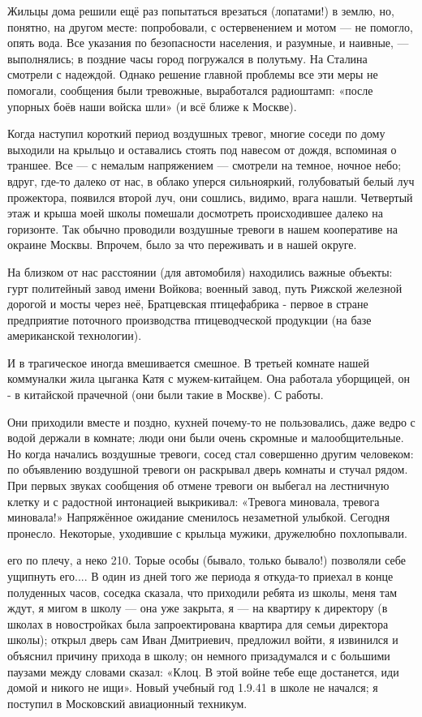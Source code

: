 \label{206-1}
Жильцы дома решили ещё раз попытаться врезаться (лопатами!) в землю, но, понятно, на другом месте: попробовали, с остервенением и мотом — не помогло, опять вода. Все указания по безопасности населения, и разумные, и наивные, — выполнялись; в поздние часы город погружался в полутьму. На Сталина смотрели с надеждой.
Однако решение главной проблемы все эти меры не помогали, сообщения были тревожные, выработался радиоштамп: «после упорных боёв наши войска шли» (и всё ближе к Москве).

\label{207-1}
Когда наступил короткий период воздушных тревог, многие соседи по дому выходили на крыльцо и оставались стоять под навесом от дождя, вспоминая о траншее. Все — с немалым напряжением — смотрели на темное, ночное небо; вдруг, где-то далеко от нас, в облако уперся сильнояркий, голубоватый белый луч прожектора, появился второй луч, они сошлись, видимо, врага нашли. Четвертый этаж и крыша моей школы помешали досмотреть происходившее далеко на горизонте. Так обычно проводили воздушные тревоги в нашем кооперативе на окраине Москвы. Впрочем, было за что переживать и в нашей округе.

\label{208-1}
На близком от нас расстоянии (для автомобиля) находились важные объекты: гурт политейный завод имени Войкова; военный завод, путь Рижской железной дорогой и мосты через неё, Братцевская птицефабрика - первое в стране предприятие поточного производства птицеводческой продукции (на базе американской технологии).

И в трагическое иногда вмешивается смешное. В третьей комнате нашей коммуналки жила цыганка Катя с мужем-китайцем. Она работала уборщицей, он - в китайской прачечной (они были такие в Москве). С работы.

\label{209-1}
Они приходили вместе и поздно, кухней почему-то не пользовались, даже ведро с водой держали в комнате; люди они были очень скромные и малообщительные. Но когда начались воздушные тревоги, сосед стал совершенно другим человеком: по объявлению воздушной тревоги он раскрывал дверь комнаты и стучал рядом. При первых звуках сообщения об отмене тревоги он выбегал на лестничную клетку и с радостной интонацией выкрикивал: «Тревога миновала, тревога миновала!» Напряжённое ожидание сменилось незаметной улыбкой. Сегодня пронесло. Некоторые, уходившие с крыльца мужики, дружелюбно похлопывали.

\label{210-1}
его по плечу, а неко 210. Торые особы (бывало, только бывало!) позволяли себе ущипнуть его.... В один из дней того же периода я откуда-то приехал в конце полуденных часов, соседка сказала, что приходили ребята из школы, меня там ждут, я мигом в школу — она уже закрыта, я — на квартиру к директору (в школах в новостройках была запроектирована квартира для семьи директора школы); открыл дверь сам Иван Дмитриевич, предложил войти, я извинился и объяснил причину прихода в школу; он немного призадумался и с большими паузами между словами сказал: «Клоц. В этой войне тебе еще достанется, иди домой и никого не ищи». Новый учебный год 1.9.41 в школе не начался; я поступил в Московский авиационный техникум.
